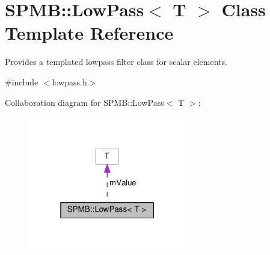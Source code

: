 \hypertarget{classSPMB_1_1LowPass}{}\section{S\+P\+MB\+:\+:Low\+Pass$<$ T $>$ Class Template Reference}
\label{classSPMB_1_1LowPass}


Provides a templated lowpass filter class for scalar elements.  




{\ttfamily \#include $<$lowpass.\+h$>$}



Collaboration diagram for S\+P\+MB\+:\+:Low\+Pass$<$ T $>$\+:\nopagebreak
\begin{figure}[H]
\begin{center}
\leavevmode
\includegraphics[width=196pt]{classSPMB_1_1LowPass__coll__graph}
\end{center}
\end{figure}

